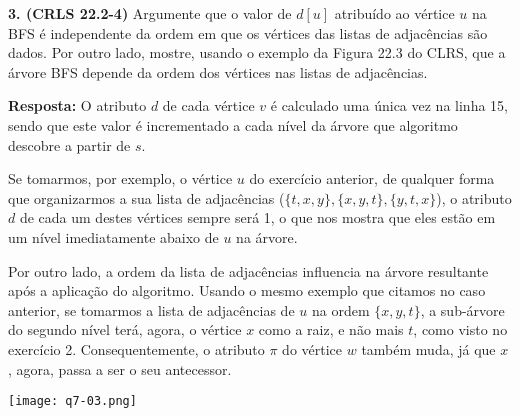 

\noindent\textbf{3. (CRLS 22.2-4)} Argumente que o valor de $d[u]$ atribuído ao vértice $u$ na BFS é independente da ordem em que os vértices das listas de adjacências são dados. Por outro lado, mostre, usando o exemplo da Figura 22.3 do CLRS, que a árvore BFS depende da ordem dos vértices nas listas de adjacências.

\textbf{Resposta:} O atributo $d$ de cada vértice $v$ é calculado uma única vez na linha 15, sendo que este valor é incrementado a cada nível da árvore que algoritmo descobre a partir de $s$.

Se tomarmos, por exemplo, o vértice $u$ do exercício anterior, de qualquer forma que organizarmos a sua lista de adjacências ($\{t, x, y\}, \{x, y, t\}, \{y, t, x\}$), o atributo $d$ de cada um destes vértices sempre será 1, o que nos mostra que eles estão em um nível imediatamente abaixo de $u$ na árvore.

Por outro lado, a ordem da lista de adjacências influencia na árvore resultante após a aplicação do algoritmo. Usando o mesmo exemplo que citamos no caso anterior, se tomarmos a lista de adjacências de $u$ na ordem $\{x, y, t\}$, a sub-árvore do segundo nível terá, agora, o vértice $x$ como a raiz, e não mais $t$, como visto no exercício 2. Consequentemente, o atributo $\pi$ do vértice $w$ também muda, já que $x$, agora, passa a ser o seu antecessor.

\begin{center}
\texttt{[image: q7-03.png]}
\label{fig:7.3-1}
\end{center}
